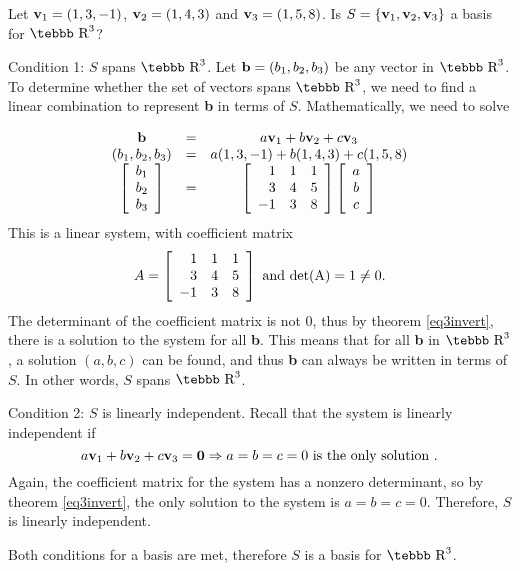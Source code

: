 \begin{example}
\label{exam5.isitbasis} Let ${\bf v}_1=(1,3,-1)$, ${\bf
v}_2=(1,4,3)$ and ${\bf v}_3=(1,5,8)$.  Is $S=\{ {\bf v}_1, {\bf
v}_2,{\bf v}_3\}$ a basis for $\mbox{\tebbb R}^3$?

Condition 1:  $S$ spans $\mbox{\tebbb R}^3$.  Let ${\bf
b}=(b_1,b_2,b_3)$ be any vector in  $\mbox{\tebbb R}^3$. To
determine whether the set of vectors spans $\mbox{\tebbb R}^3$, we
need to find a linear combination to represent {\bf b} in terms of
$S$. Mathematically, we need to solve

$$\begin{array}{ccc} {\bf b}&=&a{\bf v}_1+b{\bf v}_2+c{\bf v}_3\\
(b_1,b_2,b_3)&=&a(1,3,-1)+b(1,4,3)+c(1,5,8)\\ \left [
\begin{array}{c} b_1\\b_2\\b_3 \end{array} \right ]&=& \left [
\begin{array}{rrr} 1&1&1\\
    3&4&5\\
    -1&3&8  \end{array} \right ] \left [ \begin{array}{c}
    a\\b\\c \end{array} \right ]
\end{array}$$
This is a linear system, with coefficient matrix $$A=\left [
\begin{array}{rrr}
    1&1&1\\
    3&4&5\\
    -1&3&8 \end{array} \right ] \mbox{ and } \rm{det}(A)=1 \neq 0.$$
    The determinant of the coefficient matrix
is not 0, thus by theorem \ref{eq3invert}, there is a solution to
the system for all {\bf b}. This means that for all {\bf b} in
$\mbox{\tebbb R}^3$, a solution $(a,b,c)$ can be found, and thus
{\bf b} can always be written in terms of $S$. In other words, $S$
spans $\mbox{\tebbb R}^3$.

 Condition 2:  $S$ is linearly independent.
Recall that the system is linearly independent if $$a{\bf
v}_1+b{\bf v}_2+c{\bf v}_3={\bf 0} \Rightarrow a=b=c=0 \mbox{ is
the only solution }.$$  Again, the coefficient matrix for the
system has a nonzero determinant, so by theorem \ref{eq3invert},
the only solution to the system is \mbox{$a=b=c=0$}. Therefore,
$S$ is linearly independent.

Both conditions for a basis are met, therefore $S$ is a basis for
$\mbox{\tebbb R}^3$.
\end{example}

